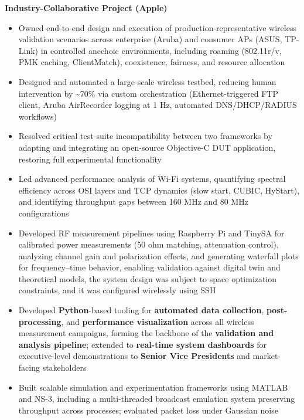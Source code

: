 \documentclass[letterpaper,11pt]{article}
\begin{document}
\item \textbf{Industry-Collaborative Project (Apple)}
\begin{itemize}[leftmargin=1.5em]
    \item Owned end-to-end design and execution of production-representative wireless validation scenarios across enterprise (Aruba) and consumer APs (ASUS, TP-Link) in controlled anechoic environments, including roaming (802.11r/v, PMK caching, ClientMatch), coexistence, fairness, and resource allocation
    \item Designed and automated a large-scale wireless testbed, reducing human intervention by \textasciitilde70\% via custom orchestration (Ethernet-triggered FTP client, Aruba AirRecorder logging at 1 Hz, automated DNS/DHCP/RADIUS workflows)
    \item Resolved critical test-suite incompatibility between two frameworks by adapting and integrating an open-source Objective-C DUT application, restoring full experimental functionality
    \item Led advanced performance analysis of Wi-Fi systems, quantifying spectral efficiency across OSI layers and TCP dynamics (slow start, CUBIC, HyStart), and identifying throughput gaps between 160 MHz and 80 MHz configurations
    \item Developed RF measurement pipelines using Raspberry Pi and TinySA for calibrated power measurements (50 ohm matching, attenuation control), analyzing channel gain and polarization effects, and generating waterfall plots for frequency–time behavior, enabling validation against digital twin and theoretical models, the system design was subject to space optimization constraints, and it was configured wirelessly using SSH

        \item Developed \textbf{Python}-based tooling for \textbf{automated data collection}, \textbf{post-processing}, and \textbf{performance visualization} across all wireless measurement campaigns, forming the backbone of the \textbf{validation and analysis pipeline}; extended to \textbf{real-time system dashboards} for executive-level demonstrations to \textbf{Senior Vice Presidents} and market-facing stakeholders



    \item Built scalable simulation and experimentation frameworks using MATLAB and NS-3, including a multi-threaded broadcast emulation system preserving throughput across processes; evaluated packet loss under Gaussian noise


\end{itemize}
\end{document}

